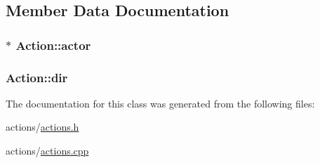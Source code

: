 \subsection{Member Data Documentation}
\hypertarget{class_action_aead5ee9e455a9b0033aca036776c255b}{
\subsubsection[{actor}]{$\ast$ Action\-::actor\hspace{0.3cm}{\ttfamily [protected]}}}\label{class_action_aead5ee9e455a9b0033aca036776c255b}
\hypertarget{class_action_a04c069c93bbaf099b040379ed976c936}{
\subsubsection[{dir}]{ Action\-::dir\hspace{0.3cm}{\ttfamily [protected]}}}\label{class_action_a04c069c93bbaf099b040379ed976c936}


The documentation for this class was generated from the following files\-:\begin{DoxyCompactItemize}
\item 
actions/\hyperlink{actions_8h}{actions.\-h}\item 
actions/\hyperlink{actions_8cpp}{actions.\-cpp}\end{DoxyCompactItemize}

